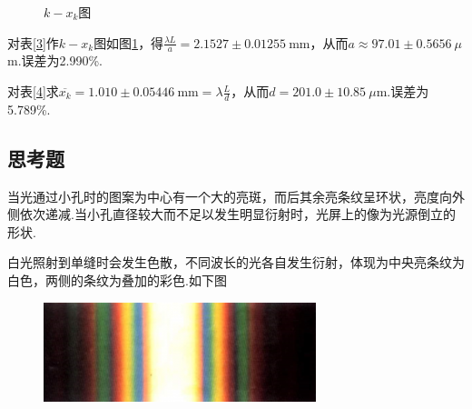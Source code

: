 \documentclass[a4paper]{article}%
\begin{document}
\begin{table}[H]
\begin{minipage}{0.5\linewidth}
\begin{figure}[H]
            \caption{$k-x_k$图}\label{0}
        \end{figure}
    \end{minipage}
\end{table}
对表\ref{3}作$k-x_k$图如图\ref{0}，得$\frac{\lambda L}{a}=2.1527\pm 0.01255~$mm，从而$a\approx 97.01\pm 0.5656~\mu$m.误差为2.990\%.

对表\ref{4}求$\overline{x_k}=1.010\pm 0.05446~$mm$=\lambda \frac{L}{d}$，从而$d=201.0\pm 10.85~\mu$m.误差为5.789\%.

\subsection{思考题}
当光通过小孔时的图案为中心有一个大的亮斑，而后其余亮条纹呈环状，亮度向外侧依次递减.当小孔直径较大而不足以发生明显衍射时，光屏上的像为光源倒立的形状.

白光照射到单缝时会发生色散，不同波长的光各自发生衍射，体现为中央亮条纹为白色，两侧的条纹为叠加的彩色.如下图
\begin{figure}[H]
    \centering
    \includegraphics[scale=.4]{1.png}
\end{figure}
\end{document}
